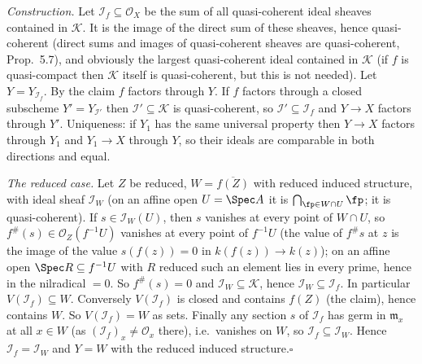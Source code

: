 \documentclass[11pt]{article}
\begin{document}
\emph{Construction.} Let $\mathcal I_f\subseteq\mathcal O_X$ be the sum of all quasi-coherent ideal sheaves contained in $\mathcal K$. It is the image of the direct sum of these sheaves, hence quasi-coherent (direct sums and images of quasi-coherent sheaves are quasi-coherent, Prop.~5.7), and obviously the largest quasi-coherent ideal contained in $\mathcal K$ (if $f$ is quasi-compact then $\mathcal K$ itself is quasi-coherent, but this is not needed). Let $Y=Y_{\mathcal I_f}$. By the claim $f$ factors through $Y$. If $f$ factors through a closed subscheme $Y'=Y_{\mathcal I'}$ then $\mathcal I'\subseteq\mathcal K$ is quasi-coherent, so $\mathcal I'\subseteq\mathcal I_f$ and $Y\to X$ factors through $Y'$. Uniqueness: if $Y_1$ has the same universal property then $Y\to X$ factors through $Y_1$ and $Y_1\to X$ through $Y$, so their ideals are comparable in both directions and equal.

\emph{The reduced case.} Let $Z$ be reduced, $W=\overline{f(Z)}$ with reduced induced structure, with ideal sheaf $\mathcal I_W$ (on an affine open $U=\Spec A$ it is $\bigcap_{\fp\in W\cap U}\fp$; it is quasi-coherent). If $s\in\mathcal I_W(U)$, then $s$ vanishes at every point of $W\cap U$, so $f^\#(s)\in\mathcal O_Z(f^{-1}U)$ vanishes at every point of $f^{-1}U$ (the value of $f^\#s$ at $z$ is the image of the value $s(f(z))=0$ in $k(f(z))\to k(z)$); on an affine open $\Spec R\subseteq f^{-1}U$ with $R$ reduced such an element lies in every prime, hence in the nilradical $=0$. So $f^\#(s)=0$ and $\mathcal I_W\subseteq\mathcal K$, hence $\mathcal I_W\subseteq\mathcal I_f$. In particular $V(\mathcal I_f)\subseteq W$. Conversely $V(\mathcal I_f)$ is closed and contains $f(Z)$ (the claim), hence contains $W$. So $V(\mathcal I_f)=W$ as sets. Finally any section $s$ of $\mathcal I_f$ has germ in $\mathfrak m_x$ at all $x\in W$ (as $(\mathcal I_f)_x\ne\mathcal O_x$ there), i.e.\ vanishes on $W$, so $\mathcal I_f\subseteq\mathcal I_W$. Hence $\mathcal I_f=\mathcal I_W$ and $Y=W$ with the reduced induced structure.\hfill$\square$
\end{document}
